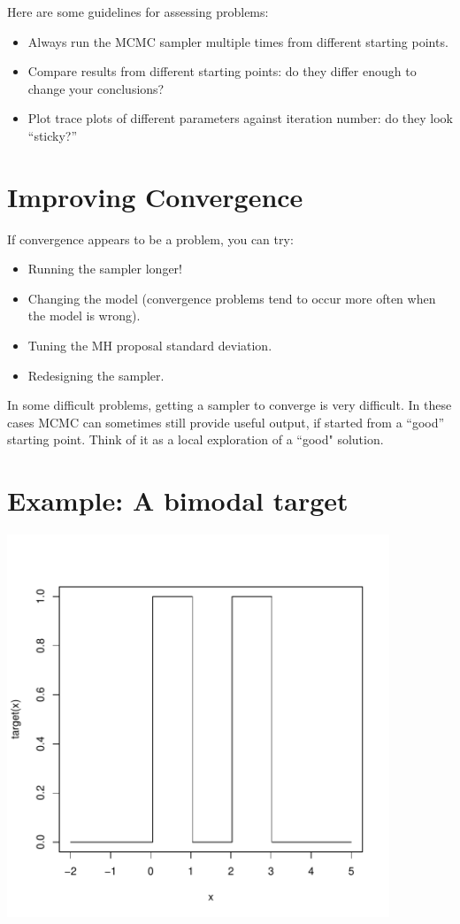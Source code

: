 Here are some guidelines for assessing problems:
\begin{itemize}
   \item Always run the MCMC sampler multiple times from different starting points.
   \item Compare results from different starting points: do they differ enough to change your conclusions?
   \item Plot trace plots of different parameters against iteration number: do they look ``sticky?''
   \end{itemize}
   

\es\bs
\section*{Improving Convergence}

If convergence appears to be a problem, you can try:
\begin{itemize}
   \item Running the sampler longer!
   \item Changing the model (convergence problems tend to occur more often when the model is wrong).
   \item Tuning the MH proposal standard deviation.
   \item Redesigning the sampler.
   \end{itemize}
   
   In some difficult problems, getting a sampler to converge is very difficult. In these cases
   MCMC can sometimes still provide useful output, if started from a ``good'' starting point.
Think of it as a local exploration of a ``good" solution.   
   
\es\bs
\section*{Example: A bimodal target}

\centerline{\includegraphics[height=4.5in]{figures/target.pdf}}

